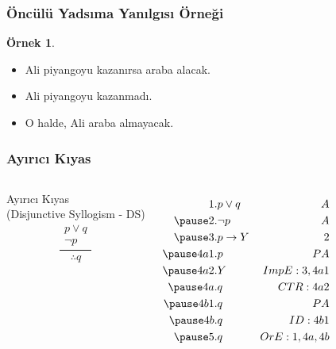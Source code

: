 \documentclass[dvipsnames]{beamer}
\theoremstyle{definition}
\theoremstyle{example}
\newtheorem{ornek}[theorem]{Örnek}
\theoremstyle{plain}
\begin{document}
\begin{frame}
  \frametitle{Öncülü Yadsıma Yanılgısı Örneği}

  \begin{ornek}
    \begin{itemize}
      \item Ali piyangoyu kazanırsa araba alacak.
      \item Ali piyangoyu kazanmadı.

      \pause
      \medskip
      \item O halde, Ali araba almayacak.
    \end{itemize}
  \end{ornek}
\end{frame}

\begin{frame}
  \frametitle{Ayırıcı Kıyas}

  \begin{columns}
    \begin{block}{Ayırıcı Kıyas\\
      (Disjunctive Syllogism - DS)}
      \[
      \frac
        {
          \begin{array}{c}
            p \vee q\\
            \neg p
          \end{array}
        }
        {
          \therefore q
        }
      \]
    \end{block}

    \pause
    \begin{eqnarray*}
      1.   & p \vee q        & A\\
      \pause
      2.   & \neg p          & A\\
      \pause
      3.   & p \rightarrow Y & 2\\
      \pause
      4a1. & p               & PA\\
      \pause
      4a2. & Y               & ImpE:3,4a1\\
      \pause
      4a.  & q               & CTR:4a2\\
      \pause
      4b1. & q               & PA\\
      \pause
      4b.  & q               & ID:4b1\\
      \pause
      5.   & q               & OrE:1,4a,4b
    \end{eqnarray*}
  \end{columns}
\end{frame}
\end{document}
